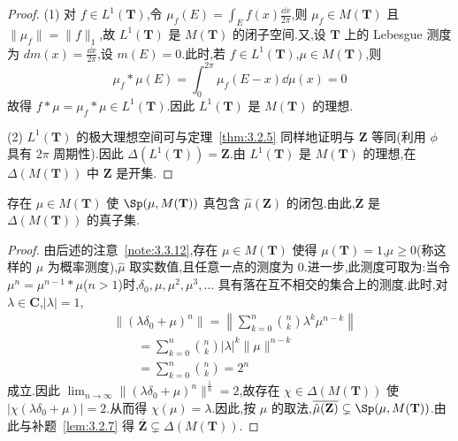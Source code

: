 \begin{proof}
(1) 对 $f \in L^{1}(\mathbf{T})$,令 $\mu_{f}(E) = \int_{E}f(x)\frac{\dd x}{2\pi}$,则 $\mu_{f} \in M(\mathbf{T})$ 且 $\|\mu_{f}\| = \|f\|_{1}$,故 $L^{1}(\mathbf{T})$ 是 $M(\mathbf{T})$ 的闭子空间.又,设 $\mathbf{T}$ 上的 Lebesgue 测度为 $dm(x) = \frac{\dd x}{2\pi}$,设 $m(E) = 0$.此时,若 $f \in L^{1}(\mathbf{T})$,$\mu \in M(\mathbf{T})$,则
\begin{equation*}
\mu_{f} * \mu(E) = \int_{0}^{2\pi}\mu_{f}(E - x)\dd\mu(x) = 0
\end{equation*}
故得 $f * \mu = \mu_{f} * \mu \in L^{1}(\mathbf{T})$.因此 $L^{1}(\mathbf{T})$ 是 $M(\mathbf{T})$ 的理想.

(2) $L^{1}(\mathbf{T})$ 的极大理想空间可与定理~\ref{thm:3.2.5} 同样地证明与 $\mathbf{Z}$ 等同(利用 $\phi$ 具有 $2\pi$ 周期性).因此 $\Delta(L^{1}(\mathbf{T})) = \mathbf{Z}$.由 $L^{1}(\mathbf{T})$ 是 $M(\mathbf{T})$ 的理想,在 $\Delta(M(\mathbf{T}))$ 中 $\mathbf{Z}$ 是开集.
\end{proof}

\begin{theorem}\label{thm:3.2.8}
存在 $\mu \in M(\mathbf{T})$ 使 $\Sp(\mu, M(\mathbf{T}))$ 真包含 $\hat{\mu}(\mathbf{Z})$ 的闭包.由此,$\overline{\mathbf{Z}}$ 是 $\Delta(M(\mathbf{T}))$ 的真子集.
\end{theorem}

\begin{proof}
由后述的注意~\ref{note:3.3.12},存在 $\mu \in M(\mathbf{T})$ 使得 $\mu(\mathbf{T}) = 1$,$\mu \geq 0$(称这样的 $\mu$ 为概率测度),$\hat{\mu}$ 取实数值,且任意一点的测度为 $0$.进一步,此测度可取为:当令 $\mu^{n} = \mu^{n-1} * \mu$($n > 1$)时,$\delta_{0}, \mu, \mu^{2}, \mu^{3}, \ldots$ 具有落在互不相交的集合上的测度.此时,对 $\lambda \in \mathbf{C}$,$|\lambda| = 1$,
\begin{align*}
& \|(\lambda\delta_{0} + \mu)^{n}\| = \left\|\sum_{k=0}^{n}\binom{n}{k}\lambda^{k}\mu^{n-k}\right\| \\
& \qquad = \sum_{k=0}^{n}\binom{n}{k}|\lambda|^{k}\|\mu\|^{n-k} \\
& \qquad = \sum_{k=0}^{n}\binom{n}{k} = 2^{n}
\end{align*}
成立.因此 $\lim_{n \to \infty}\|(\lambda\delta_{0} + \mu)^{n}\|^{\frac{1}{n}} = 2$,故存在 $\chi \in \Delta(M(\mathbf{T}))$ 使 $|\chi(\lambda\delta_{0} + \mu)| = 2$.从而得 $\chi(\mu) = \lambda$.因此,按 $\mu$ 的取法,$\overline{\hat{\mu}(\mathbf{Z})} \subsetneq \Sp(\mu, M(\mathbf{T}))$.由此与补题~\ref{lem:3.2.7} 得 $\overline{\mathbf{Z}} \subsetneq \Delta(M(\mathbf{T}))$.
\end{proof}

